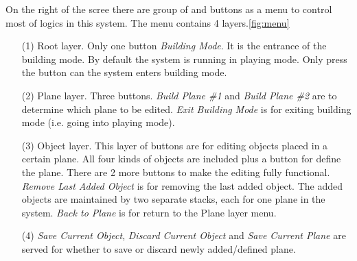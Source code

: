 \documentclass[11pt]{article}
\begin{document}
	On the right of the scree there are group of and buttons as a menu to control most of logics in this system. The menu contains 4 layers.\ref{fig:menu}
	\begin{itemize}
		\item[(1)] Root layer. Only one button \textit{Building Mode}. It is the entrance of the building mode. By default the system is running in playing mode. Only press the  button can the system enters building mode.
		\item[(2)] Plane layer. Three buttons. \textit{Build Plane \#1} and \textit{Build Plane \#2} are to determine which plane to be edited. \textit{Exit Building Mode} is for exiting building mode (i.e. going into playing mode).
		\item[(3)] Object layer. This layer of buttons are for editing objects placed in a certain plane. All four kinds of objects are included plus a button for define the plane. There are 2 more buttons to make the editing fully functional. \textit{Remove Last Added Object} is for removing the last added object. The added objects are maintained by two separate stacks, each for one plane in the system. \textit{Back to Plane} is for return to the Plane layer menu.
		\item[(4)] \textit{Save Current Object}, \textit{Discard Current Object} and \textit{Save Current Plane} are served for whether to save or discard newly added/defined plane.
	\end{itemize}
\end{document}
